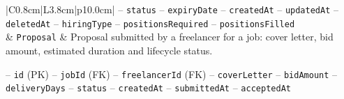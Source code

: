 \begin{center}
\begin{longtable}{|C{0.8cm}|L{3.8cm}|p{10.0cm}|}
\hspace*{1em}-- \texttt{status} \newline
\hspace*{1em}-- \texttt{expiry\allowbreak Date} \newline
\hspace*{1em}-- \texttt{created\allowbreak At} \newline
\hspace*{1em}-- \texttt{updated\allowbreak At} \newline
\hspace*{1em}-- \texttt{deleted\allowbreak At} \newline
\hspace*{1em}-- \texttt{hiring\allowbreak Type} \newline
\hspace*{1em}-- \texttt{positions\allowbreak Required} \newline
\hspace*{1em}-- \texttt{positions\allowbreak Filled} \\
 & \texttt{Proposal} & Proposal submitted by a freelancer for a job: cover letter, bid amount, estimated duration and lifecycle status.\par\smallskip
\hspace*{1em}-- \texttt{id} (PK) \newline
\hspace*{1em}-- \texttt{job\allowbreak Id} (FK) \newline
\hspace*{1em}-- \texttt{freelancer\allowbreak Id} (FK) \newline
\hspace*{1em}-- \texttt{cover\allowbreak Letter} \newline
\hspace*{1em}-- \texttt{bid\allowbreak Amount} \newline
\hspace*{1em}-- \texttt{delivery\allowbreak Days} \newline
\hspace*{1em}-- \texttt{status} \newline
\hspace*{1em}-- \texttt{created\allowbreak At} \newline
\hspace*{1em}-- \texttt{submitted\allowbreak At} \newline
\hspace*{1em}-- \texttt{accepted\allowbreak At} \newline

\end{longtable}
\end{center}

